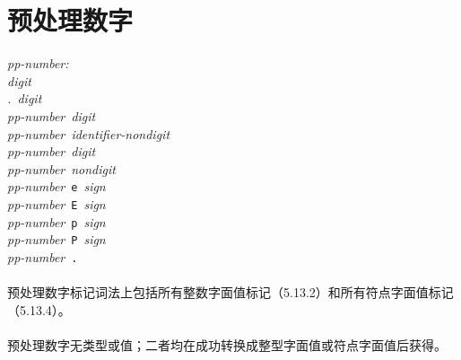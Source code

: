\section{预处理数字}
\noindent \mbox{\qquad \textit{pp-number:}}                                   \\
\mbox{\qquad \qquad \textit{digit}}                                           \\
\mbox{\qquad \qquad \textit{. digit}}                                         \\
\mbox{\qquad \qquad \textit{pp-number digit}}                                 \\
\mbox{\qquad \qquad \textit{pp-number identifier-nondigit}}                   \\
\mbox{\qquad \qquad \textit{pp-number} \texttt{\qsgl}
                    \textit{digit}}                                           \\
\mbox{\qquad \qquad \textit{pp-number} \texttt{\qsgl}
                    \textit{nondigit}}                                        \\
\mbox{\qquad \qquad \textit{pp-number} \texttt{e} \textit{sign}}              \\
\mbox{\qquad \qquad \textit{pp-number} \texttt{E} \textit{sign}}              \\
\mbox{\qquad \qquad \textit{pp-number} \texttt{p} \textit{sign}}              \\
\mbox{\qquad \qquad \textit{pp-number} \texttt{P} \textit{sign}}              \\
\mbox{\qquad \qquad \textit{pp-number} \texttt{.}} \\

\paragraph{}
预处理数字标记词法上包括所有整数字面值标记（5.13.2）和所有符点字面值标记
（5.13.4）。

\paragraph{}
预处理数字无类型或值；二者均在成功转换成整型字面值或符点字面值后获得。

